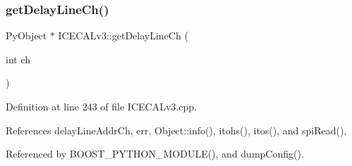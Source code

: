 \subsubsection{\texorpdfstring{get\+Delay\+Line\+Ch()}{getDelayLineCh()}}
{\footnotesize\ttfamily Py\+Object $\ast$ I\+C\+E\+C\+A\+Lv3\+::get\+Delay\+Line\+Ch (\begin{DoxyParamCaption}\item[{int}]{ch }\end{DoxyParamCaption})}



Definition at line 243 of file I\+C\+E\+C\+A\+Lv3.\+cpp.



References delay\+Line\+Addr\+Ch, err, Object\+::info(), itohs(), itos(), and spi\+Read().



Referenced by B\+O\+O\+S\+T\+\_\+\+P\+Y\+T\+H\+O\+N\+\_\+\+M\+O\+D\+U\+L\+E(), and dump\+Config().


